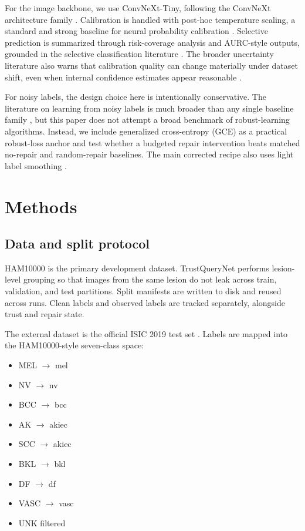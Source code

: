 \documentclass[11pt]{article}
\begin{document}
For the image backbone, we use ConvNeXt-Tiny, following the ConvNeXt architecture family \citep{liu2022convnet}. Calibration is handled with post-hoc temperature scaling, a standard and strong baseline for neural probability calibration \citep{guo2017calibration}. Selective prediction is summarized through risk-coverage analysis and AURC-style outputs, grounded in the selective classification literature \citep{geifman2017selective}. The broader uncertainty literature also warns that calibration quality can change materially under dataset shift, even when internal confidence estimates appear reasonable \citep{ovadia2019uncertainty}.

For noisy labels, the design choice here is intentionally conservative. The literature on learning from noisy labels is much broader than any single baseline family \citep{song2023noisylabelsurvey}, but this paper does not attempt a broad benchmark of robust-learning algorithms. Instead, we include generalized cross-entropy (GCE) as a practical robust-loss anchor \citep{zhang2018gce} and test whether a budgeted repair intervention beats matched no-repair and random-repair baselines. The main corrected recipe also uses light label smoothing \citep{szegedy2016inception}.

\section{Methods}

\subsection{Data and split protocol}

HAM10000 is the primary development dataset. TrustQueryNet performs lesion-level grouping so that images from the same lesion do not leak across train, validation, and test partitions. Split manifests are written to disk and reused across runs. Clean labels and observed labels are tracked separately, alongside trust and repair state.

The external dataset is the official ISIC 2019 test set \citep{combalia2022isic2019}. Labels are mapped into the HAM10000-style seven-class space:

\begin{itemize}
  \item MEL $\rightarrow$ mel
  \item NV $\rightarrow$ nv
  \item BCC $\rightarrow$ bcc
  \item AK $\rightarrow$ akiec
  \item SCC $\rightarrow$ akiec
  \item BKL $\rightarrow$ bkl
  \item DF $\rightarrow$ df
  \item VASC $\rightarrow$ vasc
  \item UNK filtered
\end{itemize}
\end{document}

